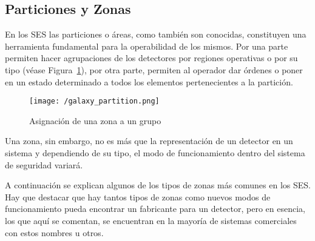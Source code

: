 \subsection{Particiones y Zonas}
\label{sub:particiones_zonas}

En los \acs{SES} las particiones o áreas, como también son conocidas, constituyen una herramienta fundamental para la operabilidad de los mismos. Por una parte permiten hacer agrupaciones de los detectores por regiones operativas o por su tipo (véase Figura~\ref{fig:galaxy_partition}), por otra parte, permiten al operador dar órdenes o poner en un estado determinado a todos los elementos pertenecientes a la partición.

\begin{figure}[!h]
\centering
\texttt{[image: /galaxy\_partition.png]}
\caption{Asignación de una zona a un grupo}
\label{fig:galaxy_partition}
\end{figure}

Una zona, sin embargo, no es  más que la representación de un detector
en un  sistema y  dependiendo de  su tipo,  el modo  de funcionamiento
dentro del sistema de seguridad variará.

A continuación se  explican algunos de los tipos de  zonas más comunes
en los \acs{SES}. Hay que destacar que hay tantos tipos de zonas como
nuevos modos de  funcionamiento pueda encontrar un  fabricante para un
detector, pero en esencia, los que  aquí se comentan, se encuentran en
la mayoría de sistemas comerciales con estos nombres u otros.

